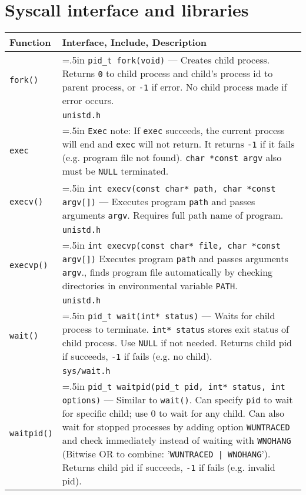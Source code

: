 \documentclass{article}
\newcommand{\indenth}[1][.5]{\hangindent=#1in
                         \hangafter=1 }
\begin{document}
\section{Syscall interface and libraries}
\begin{longtabu}{p{1in}|p{5.7in}}
    \bf Function & \textbf{Interface, Include, Description}
        \\ \hline
    \texttt{fork()} &  \indenth\texttt{pid\_t fork(void)} --- Creates child process. Returns \texttt{0} to child process and child's process id to parent process, or \texttt{-1} if error. No child process made if error occurs.
        \\
    & \texttt{unistd.h}
        \\ \hline
    \texttt{exec} & \indenth\texttt{Exec} note: If \texttt{exec} succeeds, the current process will end and \texttt{exec} will not return. It returns \texttt{-1} if it fails (e.g. program file not found). \texttt{char *const argv} also must be \texttt{NULL} terminated. \par
        \\
    \texttt{execv()} & \indenth\texttt{int execv(const char* path, char *const argv[])} --- Executes program \texttt{path} and passes arguments \texttt{argv}. Requires full path name of program.
        \\
    & \texttt{unistd.h}
        \\
    \texttt{execvp()} & \indenth\texttt{int execvp(const char* file, char *const argv[])} Executes program \texttt{path} and passes arguments \texttt{argv}., finds program file automatically by checking directories in environmental variable \texttt{PATH}.
        \\
    & \texttt{unistd.h}
        \\ \hline
    \texttt{wait()} & \indenth\texttt{pid\_t wait(int* status)} --- Waits for child process to terminate. \texttt{int* status} stores exit status of child process. Use \texttt{NULL} if not needed. Returns child pid if succeeds, \texttt{-1} if fails (e.g. no child). 
        \\
    & \texttt{sys/wait.h}
        \\
    \texttt{waitpid()} & \indenth\texttt{pid\_t waitpid(pid\_t pid, int* status, int options)} --- Similar to \texttt{wait()}. Can specify \texttt{pid} to wait for specific child; use 0 to wait for any child. Can also wait for stopped processes by adding option \texttt{WUNTRACED} and check immediately instead of waiting with \texttt{WNOHANG} (Bitwise OR to combine: '\texttt{WUNTRACED | WNOHANG}'). Returns child pid if succeeds, \texttt{-1} if fails (e.g. invalid pid).

\end{longtabu}
\end{document}
